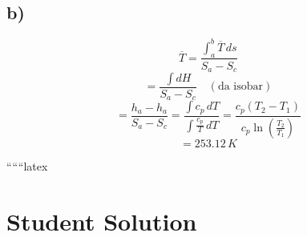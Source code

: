 

\subsection*{b)}
\[
\overline{T} = \frac{\int_{a}^{b} \overline{T} \, ds}{S_a - S_c}
\]
\[
= \frac{\int dH}{S_a - S_c} \quad \left( \text{da isobar} \right)
\]
\[
= \frac{h_a - h_a}{S_a - S_c} = \frac{\int c_p \, dT}{\int \frac{c_p}{T} \, dT} = \frac{c_p (T_2 - T_1)}{c_p \ln \left( \frac{T_2}{T_1} \right)}
\]
\[
= 253.12 \, K
\]

``````latex


\section*{Student Solution}